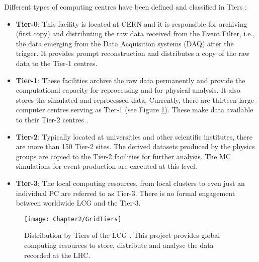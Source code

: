 Different types of computing centres have been defined and classified in Tiers \cite{Duckeck:2005rb}:
\begin{itemize}
	\item \textbf{Tier-0}: This facility is located at CERN and it is responsible for archiving (first copy) and distributing the raw data received from the Event Filter, i.e., 
				the data emerging from the Data Acquisition systems (DAQ) after the trigger.
				It provides prompt reconstruction and distributes a copy of the raw data to the Tier-1 centres.
	\item \textbf{Tier-1}: These facilities archive the raw data permanently and provide the computational capacity for reprocessing and for physical
				analysis. It also stores the simulated and reprocessed data.  Currently, there are thirteen large computer centres serving as Tier-1 (see Figure \ref{fig:Chap2:LHC_GridTier}).
				These make data available to their Tier-2 centres \cite{CERN_LHCG_centres}.
	\item \textbf{Tier-2}:  Typically located at universities and other scientific institutes, there are more than 150 Tier-2 sites. The derived datasets produced by the physics groups 
				are copied to the Tier-2 facilities for further analysis. The MC simulations for event production are executed at this level.
	\item \textbf{Tier-3}: The local computing resources, from local clusters to even just an individual PC are referred to as Tier-3. There is no formal 
				engagement between worldwide LCG and the Tier-3.
\end{itemize}
	\begin{figure}
 	  \centering
 	  \texttt{[image: Chapter2/GridTiers]}
	  \caption{Distribution by Tiers of the LCG \cite{CERN_LHCG_centres}. This project provides global computing resources to store, 
	  distribute and analyse  the data recorded at the LHC.}
	  \label{fig:Chap2:LHC_GridTier}
\end{figure}

